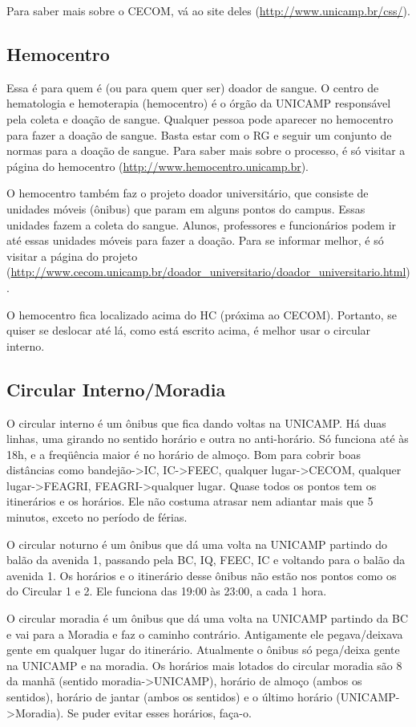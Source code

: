 \documentclass[a4paper,10pt, twocolumn]{article}
\begin{document}
Para saber mais sobre o CECOM, vá ao site deles
(\url{http://www.unicamp.br/css/}).

\subsection{Hemocentro}
Essa é para quem é (ou para quem quer ser) doador de sangue. O centro de
hematologia e hemoterapia (hemocentro) é o órgão da UNICAMP responsável pela
coleta e doação de sangue. Qualquer pessoa pode aparecer no hemocentro para
fazer a doação de sangue. Basta estar com o RG e seguir um conjunto de normas
para a doação de sangue. Para saber mais sobre o processo, é só visitar a página
do hemocentro (\url{http://www.hemocentro.unicamp.br}).

O hemocentro também faz o projeto doador universitário, que consiste de unidades
móveis (ônibus) que param em alguns pontos do campus. Essas unidades fazem
a coleta do sangue. Alunos, professores e funcionários podem ir até essas
unidades móveis para fazer a doação. Para se informar melhor, é só visitar
a página do projeto
(\url{http://www.cecom.unicamp.br/doador_universitario/doador_universitario.html}).

O hemocentro fica localizado acima do HC (próxima ao CECOM). Portanto, se quiser
se deslocar até lá, como está escrito acima, é melhor usar o circular interno.

\subsection{Circular Interno/Moradia}
O circular interno é um ônibus que fica dando voltas na UNICAMP. Há duas linhas,
uma girando no sentido horário e outra no anti-horário. Só funciona até às 18h,
e a freqüência maior é no horário de almoço. Bom para cobrir boas distâncias
como bandejão->IC, IC->FEEC, qualquer lugar->CECOM, qualquer lugar->FEAGRI,
FEAGRI->qualquer lugar. Quase todos os pontos tem os itinerários e os horários.
Ele não costuma atrasar nem adiantar mais que 5 minutos, exceto no período de
férias.

O circular noturno é um ônibus que dá uma volta na UNICAMP partindo do balão da
avenida 1, passando pela BC, IQ, FEEC, IC e voltando para o balão da avenida 1.
Os horários e o itinerário desse ônibus não estão nos pontos como os do Circular
1 e 2. Ele funciona das 19:00 às 23:00, a cada 1 hora.

O circular moradia é um ônibus que dá uma volta na UNICAMP partindo da BC e vai
para a Moradia e faz o caminho contrário. Antigamente ele pegava/deixava gente
em qualquer lugar do itinerário. Atualmente o ônibus só pega/deixa gente na
UNICAMP e na moradia. Os horários mais lotados do circular moradia são 8 da
manhã (sentido moradia->UNICAMP), horário de almoço (ambos os sentidos), horário
de jantar (ambos os sentidos) e o último horário (UNICAMP->Moradia). Se puder
evitar esses horários, faça-o.
\end{document}
